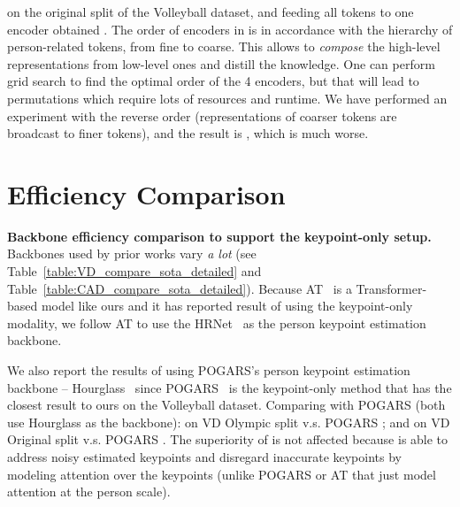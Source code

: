 \documentclass[runningheads]{llncs}
\begin{document}
on the original split of the Volleyball dataset, and feeding all tokens to one encoder obtained .
The order of encoders in \mtx is in accordance with the hierarchy of person-related tokens, from fine to coarse.
This allows \ours to \textit{compose} the high-level representations from low-level ones and distill the knowledge.
One can perform grid search 
to find the optimal order
of the 4 encoders, 
but that will lead to  
permutations which require lots of 
resources and runtime.
We have performed an experiment with the reverse order (representations of coarser tokens are broadcast to finer tokens), and the result is , 
which is much worse.



 
 



 

 
  
   
   
 \renewcommand{\thesection}{C}
\section{Efficiency Comparison}
\label{appendix_sec:efficiency_compare}

 
  
   
\noindent \textbf{Backbone efficiency comparison to support the keypoint-only setup. }
Backbones used by prior works 
vary \textit{a lot} (see Table~\ref{table:VD_compare_sota_detailed} and Table~\ref{table:CAD_compare_sota_detailed}). 
Because AT~\cite{actor-transformer} is  a Transformer-based model like ours and it  
has reported result of using the keypoint-only modality, 
we follow AT to use the HRNet~\cite{hrnet} as the person keypoint estimation backbone.


We also report the results of \ours using POGARS's person keypoint estimation backbone -- Hourglass~\cite{newell2016stacked}  
since POGARS~\cite{POGARS} is the keypoint-only method that has the closest result to ours on the Volleyball dataset. Comparing \ours with POGARS (both use Hourglass as the backbone): on VD Olympic split \ours  v.s. POGARS ; and on VD Original split \ours  v.s. POGARS . 
The  superiority of \ours is not affected  
because \ours is able to address noisy estimated keypoints and 
disregard inaccurate keypoints by modeling attention over the keypoints (unlike POGARS or AT that just model attention at the person scale).



 
\end{document}

